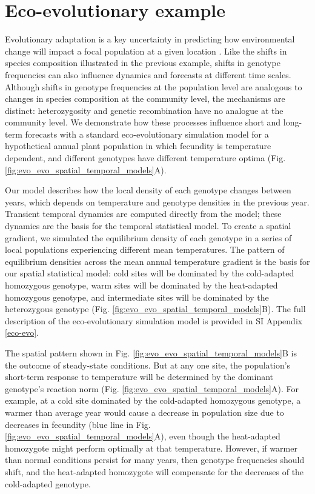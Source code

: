 \documentclass[11pt]{article}
\begin{document}
\section*{Eco-evolutionary example}

Evolutionary adaptation is a key uncertainty in predicting how environmental change will impact a focal population at a given location \citep{Hoffmann2011}. Like the shifts in species composition illustrated in the previous example, shifts in genotype frequencies can also influence dynamics and forecasts at different time scales. Although shifts in genotype frequencies at the population level are analogous to changes in species composition at the community level, the mechanisms are distinct: heterozygosity and genetic recombination have no analogue at the community level. We demonstrate how these processes influence short and long-term forecasts with a standard eco-evolutionary simulation model for a hypothetical annual plant population in which fecundity is temperature dependent, and different genotypes have different temperature optima (Fig. \ref{fig:evo_evo_spatial_temporal_models}A). 

Our model describes how the local density of each genotype changes between years, which depends on temperature and genotype densities in the previous year. Transient temporal dynamics are computed directly from the model; these dynamics are the basis for the temporal statistical model. To create a spatial gradient, we simulated the equilibrium density of each genotype in a series of local populations experiencing different mean temperatures. The pattern of equilibrium densities across the mean annual temperature gradient is the basis for our spatial statistical model: cold sites will be dominated by the cold-adapted homozygous genotype, warm sites will be dominated by the heat-adapted homozygous genotype, and intermediate sites will be dominated by the heterozygous genotype (Fig. \ref{fig:evo_evo_spatial_temporal_models}B). The full description of the eco-evolutionary simulation model is provided in SI Appendix \ref{eco-evo}. 

The spatial pattern shown in Fig. \ref{fig:evo_evo_spatial_temporal_models}B is the outcome of steady-state conditions. But at any one site, the population's short-term response to temperature will be determined by the dominant genotype's reaction norm (Fig. \ref{fig:evo_evo_spatial_temporal_models}A). For example, at a cold site dominated by the cold-adapted homozygous genotype, a warmer than average year would cause a decrease in population size due to decreases in fecundity (blue line in Fig. \ref{fig:evo_evo_spatial_temporal_models}A), even though the heat-adapted homozygote might perform optimally at that temperature. However, if warmer than normal conditions persist for many years, then genotype frequencies should shift, and the heat-adapted homozygote will compensate for the decreases of the cold-adapted genotype. 
\end{document}
